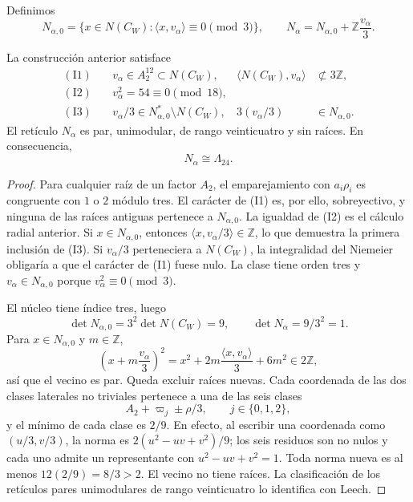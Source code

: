 Definimos
\[
N_{\alpha,0}=\{x\in N(C_W):
\langle x,v_\alpha\rangle\equiv0\pmod3\},
\qquad
N_\alpha=N_{\alpha,0}+\mathbb Z\frac{v_\alpha}{3}.
\]

\begin{theorem}
La construcción anterior satisface
\begin{align*}
\mathrm{(I1)}\quad&v_\alpha\in A_2^{12}\subset N(C_W),
&\langle N(C_W),v_\alpha\rangle&\not\subset3\mathbb Z,\\
\mathrm{(I2)}\quad&v_\alpha^2=54\equiv0\pmod{18},\\
\mathrm{(I3)}\quad&v_\alpha/3\in
N_{\alpha,0}^*\setminus N(C_W),
&3(v_\alpha/3)&\in N_{\alpha,0}.
\end{align*}
El retículo \(N_\alpha\) es par, unimodular, de rango veinticuatro y sin
raíces. En consecuencia,
\[
N_\alpha\cong\Lambda_{24}.
\]
\end{theorem}

\begin{proof}
Para cualquier raíz de un factor \(A_2\), el emparejamiento con
\(a_i\rho_i\) es congruente con \(1\) o \(2\) módulo tres. El carácter de
(I1) es, por ello, sobreyectivo, y ninguna de las raíces antiguas pertenece a
\(N_{\alpha,0}\). La igualdad de (I2) es el cálculo radial anterior. Si
\(x\in N_{\alpha,0}\), entonces
\(\langle x,v_\alpha/3\rangle\in\mathbb Z\), lo que demuestra la primera
inclusión de (I3). Si \(v_\alpha/3\) perteneciera a \(N(C_W)\), la
integralidad del Niemeier obligaría a que el carácter de (I1) fuese nulo. La
clase tiene orden tres y \(v_\alpha\in N_{\alpha,0}\) porque
\(v_\alpha^2\equiv0\pmod3\).

El núcleo tiene índice tres, luego
\[
\det N_{\alpha,0}=3^2\det N(C_W)=9,
\qquad
\det N_\alpha=9/3^2=1.
\]
Para \(x\in N_{\alpha,0}\) y \(m\in\mathbb Z\),
\[
\left(x+m\frac{v_\alpha}{3}\right)^2
=x^2+2m\frac{\langle x,v_\alpha\rangle}{3}+6m^2
\in2\mathbb Z,
\]
así que el vecino es par. Queda excluir raíces nuevas. Cada coordenada de
las dos clases laterales no triviales pertenece a una de las seis clases
\[
A_2+\varpi_j\pm\rho/3,\qquad j\in\{0,1,2\},
\]
y el mínimo de cada clase es \(2/9\). En efecto, al escribir una coordenada
como \((u/3,v/3)\), la norma es
\(2(u^2-uv+v^2)/9\); los seis residuos son no nulos y cada uno admite un
representante con \(u^2-uv+v^2=1\). Toda
norma nueva es al menos \(12(2/9)=8/3>2\). El vecino no tiene raíces. La
clasificación de los retículos pares unimodulares de rango veinticuatro lo
identifica con Leech.
\end{proof}

